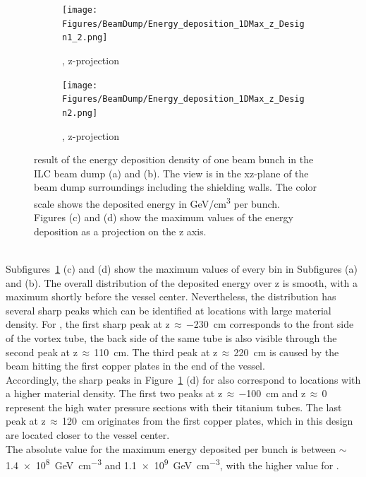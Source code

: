 \begin{figure}[!hb]
\begin{subfigure}[b]{0.485\textwidth}
   \centering
    \texttt{[image: Figures/BeamDump/Energy\_deposition\_1DMax\_z\_Design1\_2.png]}
   \caption{\designone, z-projection}
   \end{subfigure}
   \hfill
    \begin{subfigure}[b]{0.485\textwidth}
   \centering
    \texttt{[image: Figures/BeamDump/Energy\_deposition\_1DMax\_z\_Design2.png]}
   \caption{\designtwo, z-projection}
   \end{subfigure}
   \caption[Energy deposition in the ILC main beam dump]{\fluka result of the energy deposition density of one beam bunch in the ILC beam dump \designone (a) and \designtwo (b).
   The view is in the xz-plane of the beam dump surroundings including the shielding walls.
   The color scale shows the deposited energy in \si[detect-all]{\GeV}/\si{\centi\meter\cubed} per bunch.
   \\Figures (c) and (d) show the maximum values of the energy deposition as a projection on the z axis.}
   \label{fig:BeamDumps:Energy}
\end{figure}
\\Subfigures~\ref{fig:BeamDumps:Energy} (c) and (d) show the maximum values of every bin in Subfigures (a) and (b).
The overall distribution of the deposited energy over z is smooth, with a maximum shortly before the vessel center.
Nevertheless, the distribution has several sharp peaks which can be identified at locations with large material density.
For \designone, the first sharp peak at z\,$\approx$\,\SI{-230}{\centi\meter} corresponds to the front side of the vortex tube, the back side of the same tube is also visible through the second peak at z\,$\approx$\,\SI{110}{\centi\meter}.
The third peak at z\,$\approx$\,\SI{220}{\centi\meter} is caused by the beam hitting the first copper plates in the end of the vessel.
\\Accordingly, the sharp peaks in Figure~\ref{fig:BeamDumps:Energy} (d) for \designtwo also correspond to locations with a higher material density.
The first two peaks at z\,$\approx$\,\SI{-100}{\centi\meter} and z\,$\approx$\,0 represent the high water pressure sections with their titanium tubes.
The last peak at z\,$\approx$\,\SI{120}{\centi\meter} originates from the first copper plates, which in this design are located closer to the vessel center.
\\The absolute value for the maximum energy deposited per bunch is between $\sim$\SI{1.4e8}{\GeV\per\centi\meter\cubed} and \SI{1.1e9}{\GeV\per\centi\meter\cubed}, with the higher value for \designtwo.
 

